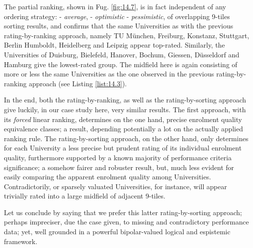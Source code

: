 The partial ranking, shown in Fug. \ref{fig:14.7}, is in fact independent of any ordering strategy: - \emph{average}, - \emph{optimistic} - \emph{pessimistic}, of overlapping 9-tiles sorting results, and confirms that the same Universities as with the previous rating-by-ranking approach, namely TU München, Freiburg, Konstanz, Stuttgart, Berlin Humboldt, Heidelberg and Leipzig appear top-rated. Similarly, the Universities of Duisburg, Bielefeld, Hanover, Bochum, Giessen, Düsseldorf and Hamburg give the lowest-rated group. The midfield here is again consisting of more or less the same Universities as the one observed in the previous rating-by-ranking approach (see Listing \ref{list:14.3}).

In the end, both the \Copeland rating-by-ranking, as well as the rating-by-sorting approach give luckily, in our case study here, very similar results. The first approach, with its \emph{forced} linear ranking, determines on the one hand, precise enrolment quality equivalence classes; a result, depending potentially a lot on the actually applied ranking rule. The rating-by-sorting approach, on the other hand, only determines for each University a less precise but prudent rating of its individual enrolment quality, furthermore supported by a known majority of performance criteria significance; a somehow fairer and robuster result, but, much less evident for easily comparing the apparent enrolment quality among Universities. Contradictorily, or sparsely valuated Universities, for instance, will appear trivially rated into a large midfield of adjacent 9-tiles.

Let us conclude by saying that we prefer this latter rating-by-sorting approach; perhaps impreciser, due the case given, to missing and contradictory performance data; yet, well grounded in a powerful bipolar-valued logical and espistemic framework.
 
